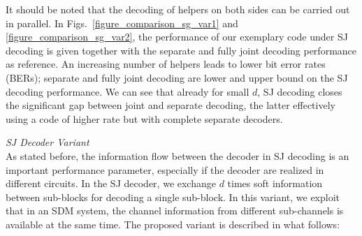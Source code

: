 It should be noted that the decoding of helpers on both sides can be carried out in parallel. In Figs.~\ref{figure_comparison_sg_var1} and \ref{figure_comparison_sg_var2}, the performance of our exemplary code under SJ decoding is given together with the separate and fully joint decoding performance as reference. An increasing number of helpers leads to lower bit error rates (BERs); separate and fully joint decoding are lower and upper bound on the SJ decoding performance. We can see that already for small $d$, SJ decoding closes the significant gap between joint and separate decoding, the latter effectively using a code of higher rate but with complete separate decoders.

\vspace*{0.8ex}
\noindent\emph{SJ Decoder Variant} \\
As stated before, the information flow between the decoder in SJ decoding is an important performance parameter, especially if the decoder are realized in different circuits. In the SJ decoder, we exchange $d$ times  soft information between sub-blocks for decoding a single sub-block. In this variant, we exploit that in an SDM system, the channel information from different sub-channels is available at the same time. The proposed variant is described in what follows:

